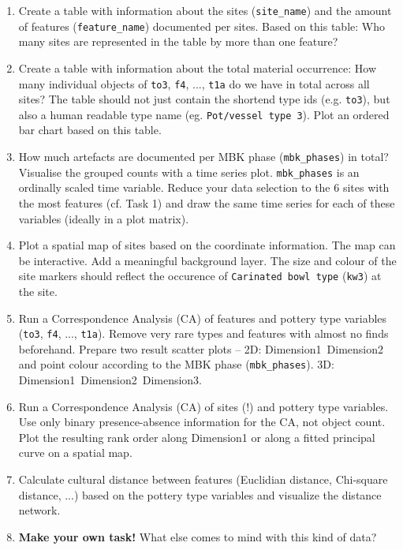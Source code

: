 \documentclass[a3, ruledsections, 8pt]{sciposter}
\begin{document}
\begin{enumerate}
\item Create a table with information about the sites (\verb|site_name|) and the amount of features (\verb|feature_name|) documented per sites. Based on this table: Who many sites are represented in the table by more than one feature? 
\item Create a table with information about the total material occurrence: How many individual objects of \verb|to3|, \verb|f4|, ..., \verb|t1a| do we have in total across all sites? The table should not just contain the shortend type ids (e.g. \verb|to3|), but also a human readable type name (eg. \verb|Pot/vessel type 3|). Plot an ordered bar chart based on this table.
\item How much artefacts are documented per MBK phase (\verb|mbk_phases|) in total? Visualise the grouped counts with a time series plot. \verb|mbk_phases| is an ordinally scaled time variable. Reduce your data selection to the 6 sites with the most features (cf. Task 1) and draw the same time series for each of these variables (ideally in a plot matrix).
\item Plot a spatial map of sites based on the coordinate information. The map can be interactive. Add a meaningful background layer. The size and colour of the site markers should reflect the occurence of \verb|Carinated bowl type| (\verb|kw3|) at the site.
\item Run a Correspondence Analysis (CA) of features and pottery type variables (\verb|to3|, \verb|f4|, ..., \verb|t1a|). Remove very rare types and features with almost no finds beforehand. Prepare two result scatter plots -- 2D: Dimension1~Dimension2 and point colour according to the MBK phase (\verb|mbk_phases|). 3D: Dimension1~Dimension2~Dimension3.
\item Run a Correspondence Analysis (CA) of sites (!) and pottery type variables. Use only binary presence-absence information for the CA, not object count. Plot the resulting rank order along Dimension1 or along a fitted principal curve on a spatial map.
\item Calculate cultural distance between features (Euclidian distance, Chi-square distance, ...) based on the pottery type variables and visualize the distance network. 
\item \textbf{Make your own task!} What else comes to mind with this kind of data? 
\end{enumerate}

\end{document}
